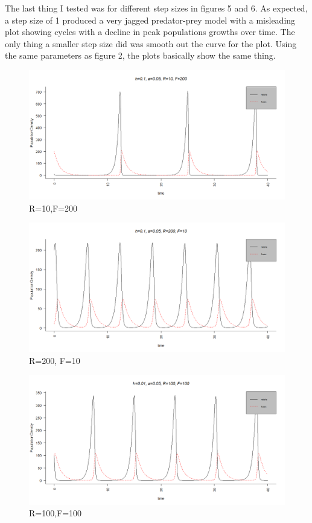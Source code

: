 \documentclass[12pt, oneside]{article}
\begin{document}
The last thing I tested was for different step sizes in figures 5 and 6. As expected, a step size of 1 produced a very jagged predator-prey model with a misleading plot showing cycles with a decline in peak populations growths over time. The only thing a smaller step size did was smooth out the curve for the plot. Using the same parameters as figure 2, the plots basically show the same thing.
\begin{figure}
\centering
\includegraphics[width=1.1\linewidth]{./plot1}
\caption{R=10,F=200}
\label{fig:plot1}
\end{figure}
\begin{figure}
\centering
\includegraphics[width=1.1\linewidth]{./plot2}
\caption{R=200, F=10}
\label{fig:plot2}
\end{figure}
\begin{figure}
\centering
\includegraphics[width=1.1\linewidth]{./plot_r100_f100}
\caption{R=100,F=100}
\label{fig:plot_r100_f100}
\end{figure}
\end{document}

